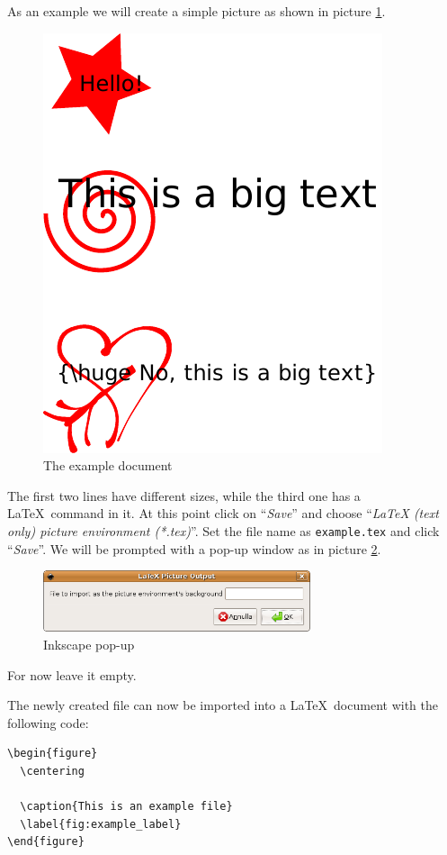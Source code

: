\documentclass[a4paper,12pt]{article}
\begin{document}
As an example we will create a simple picture as shown in picture \ref{fig:inkscape_tutorial_pic}.
\begin{figure}[tb]
  \centering
  \includegraphics{tutorial_1}
  \caption{The example document}
  \label{fig:inkscape_tutorial_pic}
\end{figure}
The first two lines have different sizes, while the third one has a \LaTeX\ command in it. At this point click on ``\emph{Save}'' and choose ``\emph{LaTeX (text only) picture environment (*.tex)}''. Set the file name as \texttt{example.tex} and click ``\emph{Save}''. We will be prompted with a pop-up window as in picture \ref{fig:inkscape_screenshot}.
\begin{figure}[tb]
  \centering
  \includegraphics[width=0.7\textwidth]{tutorial_2}
  \caption{Inkscape pop-up}
  \label{fig:inkscape_screenshot}
\end{figure}
For now leave it empty.

The newly created file can now be imported into a \LaTeX\ document with the following code:
\begin{verbatim}
\begin{figure}
  \centering
  
  \caption{This is an example file}
  \label{fig:example_label}
\end{figure}
\end{verbatim}
\end{document}
